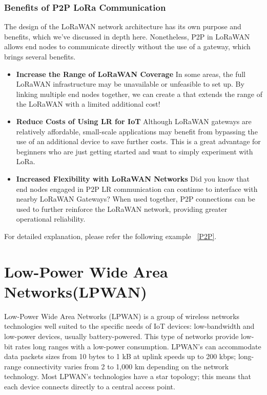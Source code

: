 \subsubsection{Benefits of P2P LoRa Communication}

The design of the LoRaWAN network architecture has its own purpose and benefits, which we’ve discussed in depth here. Nonetheless, P2P in LoRaWAN allows end nodes to communicate directly without the use of a gateway, which brings several benefits. \cite{SeeedP2PLoRa2021}

\begin{itemize}
	\item \textbf{Increase the Range of LoRaWAN Coverage} 
	In some areas, the full LoRaWAN infrastructure may be unavailable or unfeasible to set up. By linking multiple end nodes together, we can create a  that extends the range of the LoRaWAN with a limited additional cost!
	\item \textbf{Reduce Costs of Using LR for IoT}
	Although LoRaWAN gateways are relatively affordable, small-scale applications may benefit from bypassing the use of an additional device to save further costs. This is a great advantage for beginners who are just getting started and want to simply experiment with LoRa.
	\item \textbf{Increased Flexibility with LoRaWAN Networks}
	Did you know that end nodes engaged in P2P LR communication can continue to interface with nearby LoRaWAN Gateways? When used together, P2P connections can be used to further reinforce the LoRaWAN network, providing greater operational reliability. \cite{SeeedP2PLoRa2021}
\end{itemize}

For detailed explanation, please refer the following example ~\ref{P2P}.



\section{Low-Power Wide Area Networks(LPWAN)} 

Low-Power Wide Area Networks (LPWAN) is a group of wireless networks technologies well suited to the specific needs of IoT devices: low-bandwidth and low-power devices, usually battery-powered. This type of networks provide low-bit rates long ranges with a low-power consumption. LPWAN's can accommodate data packets sizes from 10 bytes to 1 kB at uplink speeds up to 200 kbps; long-range connectivity varies from 2 to 1,000 km depending on the network technology. Most LPWAN's technologies have a star topology; this means that each device connects directly to a central access point. \cite{ArduinoLoRaWAN101:2024}

